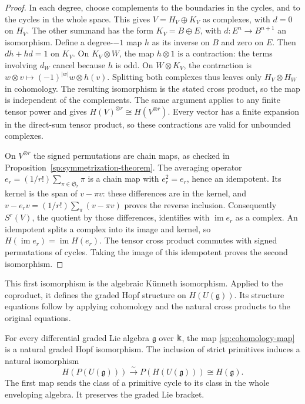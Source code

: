 \begin{proof}
In each degree, choose complements to the boundaries in the cycles,
and to the cycles in the whole space.  This gives
$V=H_V\oplus K_V$ as complexes, with $d=0$ on $H_V$.
The other summand has the form $K_V=B\oplus E$, with
$d:E^n\to B^{n+1}$ an isomorphism.  Define a degree-$-1$ map $h$
as its inverse on $B$ and zero on $E$.  Then $dh+hd=1$ on $K_V$.
On $K_V\otimes W$, the map $h\otimes1$ is a contraction: the terms
involving $d_W$ cancel because $h$ is odd.
On $W\otimes K_V$, the contraction is
$w\otimes v\mapsto(-1)^{|w|}w\otimes h(v)$.
Splitting both complexes thus leaves only $H_V\otimes H_W$ in
cohomology.  The resulting isomorphism is the stated cross product,
so the map is independent of the complements.
The same argument applies to any finite tensor power and gives
$H(V)^{\otimes r}\cong H(V^{\otimes r})$.
Every vector has a finite expansion in the direct-sum tensor product,
so these contractions are valid for unbounded complexes.

On $V^{\otimes r}$ the signed permutations are chain maps, as checked
in Proposition~\ref{sp:symmetrization-theorem}.
The averaging operator $e_r=(1/r!)\sum_{\pi\in\mathfrak S_r}\pi$
is a chain map with $e_r^2=e_r$, hence an idempotent.
Its kernel is the span of $v-\pi v$:
these differences are in the kernel, and
$v-e_rv=(1/r!)\sum_\pi(v-\pi v)$ proves the reverse inclusion.
Consequently $S^r(V)$, the quotient by those differences, identifies
with $\operatorname{im}e_r$ as a complex.
An idempotent splits a complex into its image and kernel, so
$H(\operatorname{im}e_r)=\operatorname{im}H(e_r)$.
The tensor cross product commutes with signed permutations of cycles.
Taking the image of this idempotent proves the second isomorphism.
\end{proof}

This first isomorphism is the algebraic K\"unneth isomorphism.
Applied to the coproduct, it defines the graded Hopf structure on
$H(U(\mathfrak g))$.  Its structure equations follow by applying
cohomology and the natural cross products to the original equations.

\begin{theorem}
\label{sp:cohomology}
For every differential graded Lie algebra $\mathfrak g$ over $\Bbbk$,
the map \eqref{sp:cohomology-map} is a natural graded Hopf isomorphism.
The inclusion of strict primitives induces a natural isomorphism
\begin{equation}
 H(P(U(\mathfrak g)))\xrightarrow{\sim}
 P(H(U(\mathfrak g)))\cong H(\mathfrak g).
 \label{sp:primitive-cohomology}
\end{equation}
The first map sends the class of a primitive cycle to its class in
the whole enveloping algebra.  It preserves the graded Lie bracket.
\end{theorem}

